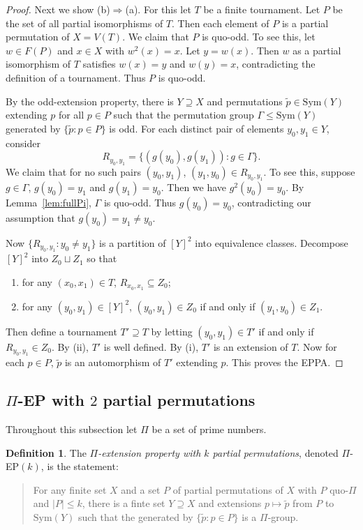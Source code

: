 \documentclass[11pt]{amsart}
\theoremstyle{definition}
\newtheorem{definition}[theorem]{Definition}
\theoremstyle{definition}
\numberwithin{equation}{section}
\begin{document}
\begin{proof}
Next we show (b)$\Rightarrow$(a). For this let $T$ be a finite tournament. Let $P$ be the set of all partial isomorphisms of $T$. Then each element of $P$ is a partial permutation of $X=V(T)$. We claim that $P$ is quo-odd. To see this, let $w\in F(P)$ and $x\in X$ with $w^2(x)=x$. Let $y=w(x)$. Then $w$ as a partial isomorphism of $T$ satisfies $w(x)=y$ and $w(y)=x$, contradicting the definition of a tournament. Thus $P$ is quo-odd. 

By the odd-extension property, there is $Y\supseteq X$ and permutations $\tilde{p}\in \mbox{Sym}(Y)$ extending $p$ for all $p\in P$ such that the permutation group $\Gamma\leq \mbox{Sym}(Y)$ generated by $\{\tilde{p}\colon p\in P\}$ is odd. For each distinct pair of elements $y_0, y_1\in Y$, consider
$$ R_{y_0,y_1}=\{(g(y_0), g(y_1))\colon g\in \Gamma\}. $$
We claim that for no such pairs $(y_0, y_1)$, $(y_1, y_0)\in R_{y_0,y_1}$. To see this, suppose $g\in \Gamma$, $g(y_0)=y_1$ and $g(y_1)=y_0$. Then we have $g^2(y_0)=y_0$. By Lemma~\ref{lem:fullPi}, $\Gamma$ is quo-odd. Thus $g(y_0)=y_0$, contradicting our assumption that $g(y_0)=y_1\neq y_0$.

Now $\{R_{y_0, y_1}\colon y_0\neq y_1\}$ is a partition of $[Y]^2$ into equivalence classes. Decompose $[Y]^2$ into $Z_0\sqcup Z_1$ so that 
\begin{enumerate}
\item[(i)] for any $(x_0,x_1)\in T$, $R_{x_0,x_1}\subseteq Z_0$;
\item[(ii)] for any $(y_0, y_1)\in[Y]^2$, $(y_0, y_1)\in Z_0$ if and only if $(y_1,y_0)\in Z_1$.
\end{enumerate}
Then define a tournament $T'\supseteq T$ by letting $(y_0, y_1)\in T'$ if and only if $R_{y_0,y_1}\in Z_0$. By (ii), $T'$ is well defined. By (i), $T'$ is an extension of $T$. Now for each $p\in P$, $\tilde{p}$ is an automorphism of $T'$ extending $p$. This proves the EPPA.
\end{proof}



\subsection{$\Pi$-EP with $2$ partial permutations}

Throughout this subsection let $\Pi$ be a set of prime numbers.

\begin{definition} The {\em $\Pi$-extension property with $k$ partial permutations}, denoted $\Pi$-EP$(k)$, is the statement:
\begin{quote}
For any finite set $X$ and a set $P$ of partial permutations of $X$ with $P$ quo-$\Pi$ and $|P|\leq k$, there is a finte set $Y\supseteq X$ and extensions $p\mapsto \tilde{p}$ from $P$ to $\mbox{Sym}(Y)$ such that the generated by $\{\tilde{p}\colon p\in P\}$ is a $\Pi$-group.
\end{quote}
\end{definition}
\end{document}
